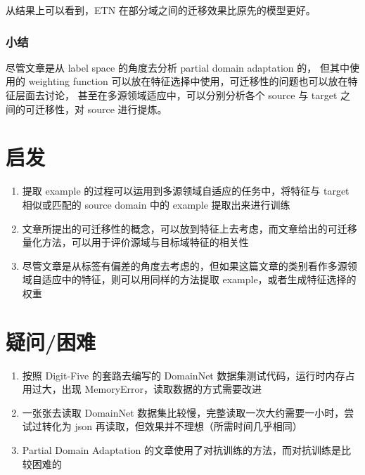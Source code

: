 \documentclass[UTF8]{ctexart}
\begin{document}
从结果上可以看到，ETN 在部分域之间的迁移效果比原先的模型更好。

\subsubsection{小结}
尽管文章是从 label space 的角度去分析 partial domain adaptation 的，
但其中使用的 weighting function 可以放在特征选择中使用，可迁移性的问题也可以放在特征层面去讨论，
甚至在多源领域适应中，可以分别分析各个 source 与 target 之间的可迁移性，对 source 进行提炼。

\section{启发}
\begin{enumerate}
    \item 提取 example 的过程可以运用到多源领域自适应的任务中，将特征与 target 相似或匹配的 source domain 中的 example 提取出来进行训练
    \item 文章所提出的可迁移性的概念，可以放到特征上去考虑，而文章给出的可迁移量化方法，可以用于评价源域与目标域特征的相关性
    \item 尽管文章是从标签有偏差的角度去考虑的，但如果这篇文章的类别看作多源领域自适应中的特征，则可以用同样的方法提取 example，或者生成特征选择的权重
\end{enumerate}
\section{疑问/困难}
\begin{enumerate}
    \item 按照 Digit-Five 的套路去编写的 DomainNet 数据集测试代码，运行时内存占用过大，出现 MemoryError，读取数据的方式需要改进
    \item 一张张去读取 DomainNet 数据集比较慢，完整读取一次大约需要一小时，尝试过转化为 json 再读取，但效果并不理想（所需时间几乎相同）
    \item Partial Domain Adaptation 的文章使用了对抗训练的方法，而对抗训练是比较困难的
\end{enumerate}
\end{document}
